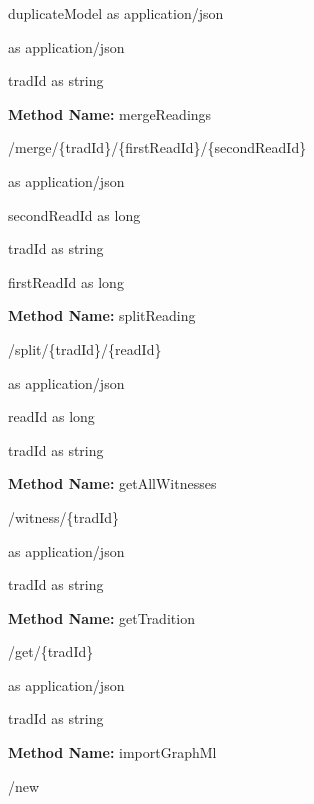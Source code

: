 \begin{request}
duplicateModel as application/json
\end{request}
\begin{response}
 as application/json
\end{response}
\begin{parameter}
tradId as string
\end{parameter}
\textbf{Method Name: }mergeReadings
\begin{post}
/merge/\{tradId\}/\{firstReadId\}/\{secondReadId\}
\end{post}
\begin{response}
 as application/json
\end{response}
\begin{parameter}
secondReadId as long
\end{parameter}
\begin{parameter}
tradId as string
\end{parameter}
\begin{parameter}
firstReadId as long
\end{parameter}
\textbf{Method Name: }splitReading
\begin{post}
/split/\{tradId\}/\{readId\}
\end{post}
\begin{response}
 as application/json
\end{response}
\begin{parameter}
readId as long
\end{parameter}
\begin{parameter}
tradId as string
\end{parameter}
\textbf{Method Name: }getAllWitnesses
\begin{get}
/witness/\{tradId\}
\end{get}
\begin{response}
 as application/json
\end{response}
\begin{parameter}
tradId as string
\end{parameter}
\textbf{Method Name: }getTradition
\begin{get}
/get/\{tradId\}
\end{get}
\begin{response}
 as application/json
\end{response}
\begin{parameter}
tradId as string
\end{parameter}
\textbf{Method Name: }importGraphMl
\begin{post}
/new
\end{post}
